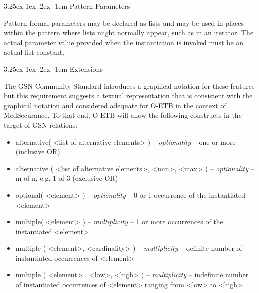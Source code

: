 \documentclass[12pt,twoside,a4paper]{article}
\makeatletter
\renewcommand\paragraph{\@startsection{paragraph}{5}{\z@}%
  {3.25ex \@plus1ex \@minus.2ex}%
  {-1em}%
  {\normalfont\normalsize\bfseries}}
\makeatother
\begin{document}
\hypertarget{pattern-parameters}{%
\paragraph{Pattern Parameters}\label{pattern-parameters}}

Pattern formal parameters may be declared as lists and may be used in places within the pattern where lists might normally appear, such as in an iterator. The actual parameter value provided when the instantiation is invoked must be an actual list constant.

\hypertarget{extensions}{%
\paragraph{Extensions}\label{extensions}}

The GSN Community Standard introduces a graphical notation for these features but this requirement suggests a textual representation that is consistent with the graphical notation and considered adequate for O-ETB in the context of MedSecurance. To that end, O-ETB will allow the following constructs in the target of GSN relations:

\begin{itemize}
\item
  alternative( \textless list of alternative elements\textgreater{} ) -- \emph{optionality} -- one or more (inclusive OR)
\item
  alternative ( \textless list of alternative elements\textgreater, \textless min\textgreater, \textless max\textgreater{} ) -- \emph{optionality} -- m of n, e.g. 1 of 3 (exclusive OR)
\item
  optional( \textless element\textgreater{} ) -- \emph{optionality} -- 0 or 1 occurrence of the instantiated \textless element\textgreater{}
\item
  multiple( \textless element\textgreater{} ) -- \emph{multiplicity} -- 1 or more occurrences of the instantiated \textless element\textgreater{}
\item
  multiple ( \textless element\textgreater, \textless cardinality\textgreater{} ) -- \emph{multiplicity} -- definite number of instantiated occurrences of \textless element\textgreater{}
\item
  multiple ( \textless element\textgreater{} , \textless low\textgreater, \textless high\textgreater{} ) -- \emph{multiplicity} -- indefinite number of instantiated occurrences of \textless element\textgreater{} ranging from \textless low\textgreater{} to \textless high\textgreater{}
\end{itemize}
\end{document}
